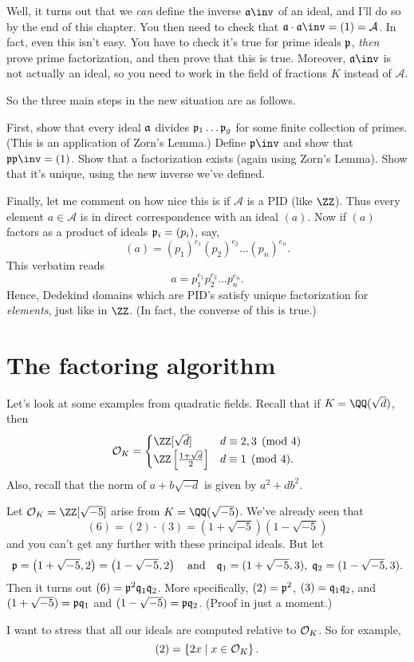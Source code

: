 Well, it turns out that we \emph{can} define the inverse $\aa\inv$ of an ideal,
and I'll do so by the end of this chapter.
You then need to check that $\aa \cdot \aa\inv = (1) = \mathcal A$.
In fact, even this isn't easy.
You have to check it's true for prime ideals $\pp$,
\emph{then} prove prime factorization,
and then prove that this is true.
Moreover, $\aa\inv$ is not actually an ideal, so you need to
work in the field of fractions $K$ instead of $\mathcal A$.

So the three main steps in the new situation are as follows.
\begin{enumerate}[(1)]
	\ii First, show that every ideal $\aa$ divides $\pp_1 \dots \pp_g$ for some finite collection of primes.
	(This is an application of Zorn's Lemma.)
	\ii Define $\pp\inv$ and show that $\pp \pp\inv = (1)$.
	\ii Show that a factorization exists (again using Zorn's Lemma).
	\ii Show that it's unique, using the new inverse we've defined.
\end{enumerate}

Finally, let me comment on how nice this is if $\mathcal A$ is a PID (like $\ZZ$).
Thus every element $a \in \mathcal A$ is in direct correspondence with an ideal $(a)$.
Now if $(a)$ factors as a product of ideals $\pp_i = (p_i)$, say,
\[ (a) = (p_1)^{e_1} (p_2)^{e_2} \dots (p_n)^{e_n} . \]
This verbatim reads \[ a = p_1^{e_1} p_2^{e_2} \dots p_n^{e_n}. \]
Hence, Dedekind domains which are PID's satisfy unique factorization for \emph{elements},
just like in $\ZZ$. (In fact, the converse of this is true.)

\section{The factoring algorithm}
Let's look at some examples from quadratic fields.
Recall that if $K = \QQ(\sqrt{d})$, then
\[
	\OO_K =
	\begin{cases}
		\ZZ[\sqrt d] & d \equiv 2,3 \pmod 4 \\
		\ZZ\left[ \frac{1+\sqrt d}{2} \right] & d \equiv 1 \pmod 4.
	\end{cases}
\]
Also, recall that the norm of $a+b\sqrt{-d}$ is given by $a^2+db^2$.


\begin{example}
	Let $\OO_K = \ZZ[\sqrt{-5}]$ arise from $K = \QQ(\sqrt{-5})$.
	We've already seen that
	\[ (6) = (2) \cdot (3) = \left( 1+\sqrt{-5} \right)\left( 1-\sqrt{-5} \right) \]
	and you can't get any further with these principal ideals.
	But let
	\[ \pp = \left( 1+\sqrt{-5}, 2 \right) = \left( 1-\sqrt{-5}, 2 \right)
		\quad\text{and}\quad \qq_1 = (1+\sqrt{-5},3),
		\; \qq_2 = (1-\sqrt{-5},3). \]
	Then it turns out $(6) = \pp^2\qq_1\qq_2$.
	More specifically, $(2) = \pp^2$, $(3) = \qq_1\qq_2$,
	and $(1+\sqrt{-5}) = \pp\qq_1$ and $(1-\sqrt{-5}) = \pp\qq_2$.
	(Proof in just a moment.)
\end{example}
I want to stress that all our ideals are computed relative to $\OO_K$.
So for example, \[ (2) = \left\{ 2x \mid x \in \OO_K \right\}. \]

